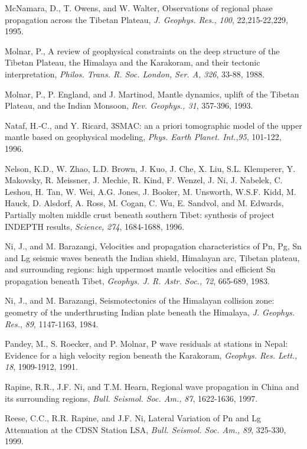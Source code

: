 \documentclass[12pt]{article}
\begin{document}
\begin{references}
McNamara, D., T. Owens, and W. Walter, Observations of 
regional phase propagation across the Tibetan Plateau, {\it J. Geophys. Res.,}
{\it 100}, 22,215-22,229, 1995.

Molnar, P., A review of geophysical constraints on the deep structure
of the Tibetan Plateau, the Himalaya and the Karakoram, and their tectonic
interpretation, {\it Philos. Trans. R. Soc. London, Ser. A,} {\it 326}, 33-88,
1988.

Molnar, P., P. England, and J. Martinod, Mantle dynamics, uplift of the 
Tibetan Plateau, and the Indian Monsoon, {\it Rev. Geophys., 31}, 357-396, 1993.

Nataf, H.-C., and Y. Ricard, {3SMAC: an a priori tomographic
model of the upper mantle based on geophysical modeling}, {\it
Phys. Earth Planet. Int.},{\it 95}, {101-122}, 1996.

Nelson, K.D., W. Zhao, L.D. Brown, J. Kuo, J. Che, X. Liu, S.L. Klemperer,
Y. Makovsky, R. Meissner, J. Mechie, R. Kind, F. Wenzel, J. Ni, J. Nabelek,
C. Leshou, H. Tan, W. Wei, A.G. Jones, J. Booker, M. Unsworth, W.S.F. Kidd,
M. Hauck, D. Alsdorf, A. Ross, M. Cogan, C. Wu, E. Sandvol, and M. Edwards,
Partially molten middle crust beneath southern Tibet: synthesis of
project INDEPTH results, {\it Science,} {\it 274}, 1684-1688, 1996.

Ni, J., and M. Barazangi, Velocities and propagation characteristics
of Pn, Pg, Sn and Lg seismic waves beneath the Indian shield, Himalayan arc,
Tibetan plateau, and surrounding regions: high uppermost mantle velocities
and efficient Sn propagation beneath Tibet, {\it Geophys. J. R. Astr. Soc.,}
{\it 72}, 665-689, 1983.

Ni, J., and M. Barazangi, Seismotectonics of the Himalayan collision zone:
geometry of the underthrusting Indian plate beneath the Himalaya, {\it J. 
Geophys. Res.}, {\it 89}, 1147-1163, 1984.

Pandey, M., S. Roecker, and P. Molnar, P wave residuals at stations in
Nepal: Evidence for a high velocity region beneath the Karakoram, {\it Geophys.
Res. Lett.,} {\it 18}, 1909-1912, 1991.



Rapine, R.R., J.F. Ni, and T.M. Hearn, Regional wave propagation in China
and its surrounding regions, {\it Bull. Seismol. Soc. Am.,} {\it 87},
1622-1636, 1997.

Reese, C.C., R.R. Rapine, and J.F. Ni, Lateral Variation of Pn and Lg
Attenuation at the CDSN Station LSA, {\it Bull. Seismol. Soc. Am.,} {\it 89},
325-330, 1999.


\end{references}
\end{document}
